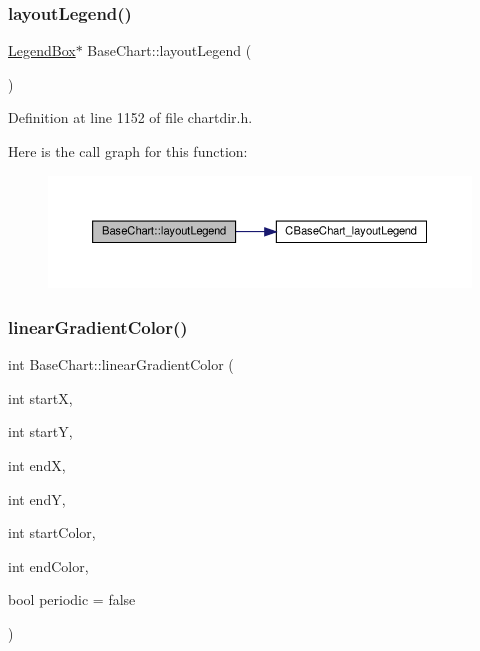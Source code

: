 \subsubsection{\texorpdfstring{layout\+Legend()}{layoutLegend()}}
{\footnotesize\ttfamily \hyperlink{class_legend_box}{Legend\+Box}$\ast$ Base\+Chart\+::layout\+Legend (\begin{DoxyParamCaption}{ }\end{DoxyParamCaption})\hspace{0.3cm}{\ttfamily [inline]}}



Definition at line 1152 of file chartdir.\+h.

Here is the call graph for this function\+:
\nopagebreak
\begin{figure}[H]
\begin{center}
\leavevmode
\includegraphics[width=350pt]{class_base_chart_a3b89c7ea3cce0558699dea32bcfba330_cgraph}
\end{center}
\end{figure}
\mbox{\label{class_base_chart_af58f13bbae3eb6f0ac2669ceaa4ae935}} 
\subsubsection{\texorpdfstring{linear\+Gradient\+Color()}{linearGradientColor()}\hspace{0.1cm}{\footnotesize\ttfamily [1/2]}}
{\footnotesize\ttfamily int Base\+Chart\+::linear\+Gradient\+Color (\begin{DoxyParamCaption}\item[{int}]{startX,  }\item[{int}]{startY,  }\item[{int}]{endX,  }\item[{int}]{endY,  }\item[{int}]{start\+Color,  }\item[{int}]{end\+Color,  }\item[{bool}]{periodic = {\ttfamily false} }\end{DoxyParamCaption})\hspace{0.3cm}{\ttfamily [inline]}}




